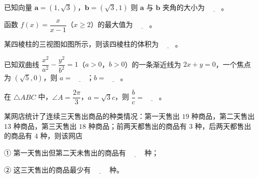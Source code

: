 \begin{question}
已知向量 \(\boldsymbol{a}=(1,\sqrt{3})\)，\(\boldsymbol{b}=(\sqrt{3},1)\) 则 \(\boldsymbol{a}\) 与 \(\boldsymbol{b}\) 夹角的大小为 \(\underline{\qquad}\)。

\end{question}
\begin{question}
函数 \(f(x)=\dfrac{x}{x-1}\)（\(x\geqslant 2\)）的最大值为 \(\underline{\qquad}\)。

\Needspace{0.4\textheight}
\end{question}
\begin{question}
某四棱柱的三视图如图所示，则该四棱柱的体积为 \(\underline{\qquad}\)。
\nopagebreak[4]
\begin{center}\end{center}
\nopagebreak[4]
\end{question}
\begin{question}
已知双曲线 \(\dfrac{x^{2}}{a^{2}}-\dfrac{y^{2}}{b^{2}}=1\)（\(a>0\)，\(b>0\)）的一条渐近线为 \(2x+y=0\)，一个焦点为 \((\sqrt{5},0)\)，则 \(a=\underline{\qquad}\)；\(b=\underline{\qquad}\)。

\end{question}
\begin{question}
在 \(\triangle ABC\) 中，\(\angle A=\dfrac{2\pi}{3}\)，\(a=\sqrt{3}c\)，则 \(\dfrac{b}{c}=\underline{\qquad}\)。

\end{question}
\begin{question}
某网店统计了连续三天售出商品的种类情况：第一天售出 \(19\) 种商品，第二天售出 \(13\) 种商品，第三天售出 \(18\) 种商品；前两天都售出的商品有 \(3\) 种，后两天都售出的商品有 \(4\) 种，则该网店

① 第一天售出但第二天未售出的商品有 \(\underline{\qquad}\) 种；

② 这三天售出的商品最少有 \(\underline{\qquad}\) 种。

\end{question}

